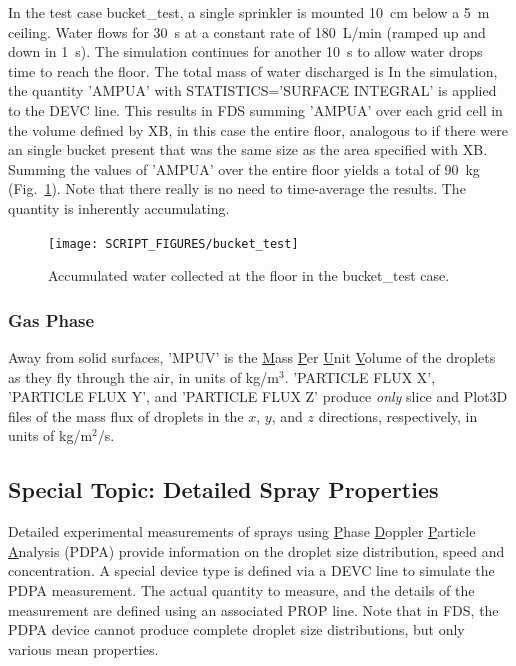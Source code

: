 \documentclass[11pt]{book}
\begin{document}
In the test case {\ct bucket\_test}, a single sprinkler is
mounted 10~cm below a 5~m ceiling. Water flows for 30~s at a constant
rate of 180~L/min (ramped up and down in 1~s).  The simulation continues for another 10~s to allow
water drops time to reach the floor. The total mass of water discharged is
\be
\ee
In the simulation, the quantity {\ct 'AMPUA'} with {\ct STATISTICS='SURFACE INTEGRAL'} is applied to the {\ct DEVC} line.  This results in FDS summing {\ct 'AMPUA'} over each grid cell in the volume defined by {\ct XB}, in this case the entire floor, analogous to if there were an single bucket present that was the same size as the area specified with {\ct XB}.
Summing the values of {\ct 'AMPUA'} over the entire
floor yields a total of 90~kg (Fig.~\ref{bucket_test_fig}). Note that there really is no need to time-average the results. The quantity is inherently accumulating.

\begin{figure}[ht]
\centering
\texttt{[image: SCRIPT\_FIGURES/bucket\_test]}
\caption[Results of the {\ct bucket\_test} case]{Accumulated water collected at the floor in the {\ct bucket\_test} case.}
\label{bucket_test_fig}
\end{figure}


\subsubsection{Gas Phase}

Away from solid surfaces, {\ct 'MPUV'} is the \underline{M}ass \underline{P}er \underline{U}nit \underline{V}olume of the droplets as they fly through
the air, in units of kg/m$^3$.  {\ct 'PARTICLE FLUX X'},  {\ct 'PARTICLE FLUX Y'}, and {\ct 'PARTICLE FLUX Z'} produce {\em only} slice and Plot3D files
of the mass flux of droplets in the $x$, $y$, and $z$ directions, respectively, in units of kg/m$^2$/s.



\subsection{Special Topic: Detailed Spray Properties}
\label{PDPA}

Detailed experimental measurements of sprays using \underline{P}hase \underline{D}oppler \underline{P}article
\underline{A}nalysis (PDPA) provide information on the droplet size distribution, speed and concentration.
A special device type is defined via a {\ct DEVC} line to simulate the PDPA measurement. The actual quantity to measure, and the details of the
measurement are defined using an associated {\ct PROP} line. Note that in FDS, the PDPA device cannot produce complete droplet size
distributions, but only various mean properties.
\end{document}
